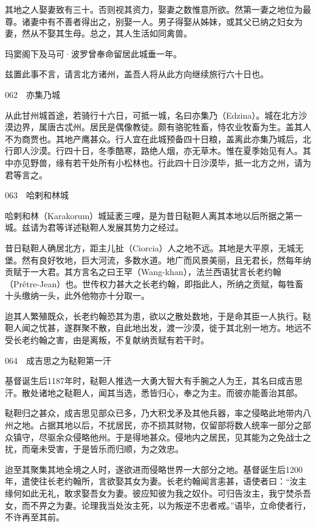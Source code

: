 \documentclass[12pt,UTF8]{ctexbook}
\begin{document}
其地之人娶妻致有三十。否则视其资力，娶妻之数惟意所欲。然第一妻之地位为最尊。诸妻中有不善者得出之，别娶一人。男子得娶从姊妹，或其父已纳之妇女为妻，然从不娶其生母。总之，其人生活如同禽兽。

玛窦阁下及马可·波罗曾奉命留居此城垂一年。

兹置此事不言，请言北方诸州，盖吾人将从此方向继续旅行六十日也。





062　亦集乃城

从此甘州城首途，若骑行十六日，可抵一城，名曰亦集乃（Edzina）。城在北方沙漠边界，属唐古忒州。居民是偶像教徒。颇有骆驼牲畜，恃农业牧畜为生。盖其人不为商贾也。其地产鹰甚众。行人宜在此城预备四十日粮，盖离此亦集乃城后，北行即人沙漠。行四十日，冬季酷寒，路绝人烟，亦无草木。惟在夏季始见有人。其中亦见野兽，缘有若干处所有小松林也。行此四十日沙漠毕，抵一北方之州，请为君等言之。





063　哈剌和林城

哈剌和林（Karakorum）城延袤三哩，是为昔日鞑靼人离其本地以后所据之第一城。兹请为君等详述鞑靼人发展其势力之经过。

昔日鞑靼人确居北方，距主儿扯（Ciorcia）人之地不远。其地是大平原，无城无堡。然有良好牧地，巨大河流，多数水道。地广而风景美丽，且无君长，然每年纳贡赋于一大君。其方言名之曰王罕（Wang-khan），法兰西语犹言长老约翰（Prêtre-Jean）也。世传权力甚大之长老约翰，即指此人，所纳之贡赋，每牲畜十头缴纳一头，此外他物亦十分取一。

迨其人繁殖既众，长老约翰恐其为患，欲以之散处数地，于是命其臣一人执行。鞑靼人闻之忧甚，遂群聚不散，自此地出发，渡一沙漠，徙于其北别一地方。地远不受长老约翰之害，由是离叛，不复献纳贡赋有若干时。





064　成吉思之为鞑靼第一汗

基督诞生后1187年时，鞑靼人推选一大勇大智大有手腕之人为王，其名曰成吉思汗。散处诸地之鞑靼人，闻其当选，悉皆归心，奉之为主。而彼亦能善治其部。

鞑靼归之甚众，成吉思见部众已多，乃大积戈矛及其他兵器，率之侵略此地带内八州之地。占据其地以后，不扰居民，亦不损其财物，仅留部将数人统率一部分之部众镇守，尽驱余众侵略他州。于是得地甚众。侵地内之居民，见其能为之免战士之扰，而毫未受害，于是皆乐而归顺，为之效忠。

迨至其聚集其地全境之人时，遂欲进而侵略世界一大部分之地。基督诞生后1200年，遣使往长老约翰所，言欲娶其女为妻。长老约翰闻言恚甚，语使者曰：“汝主缘何如此无礼，敢求娶吾女为妻。彼应知彼为我之奴仆。可归告汝主，我宁焚杀吾女，而不畀之为妻。论理我当处汝主死，以为叛逆不忠者戒。”语毕，立命使者行，不许再至其前。
\end{document}
